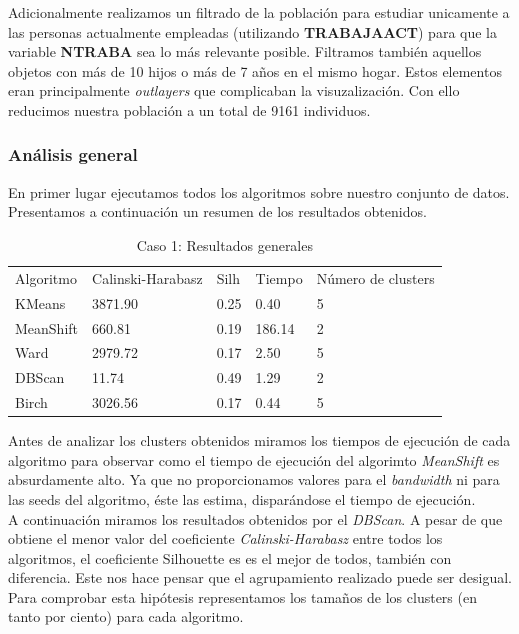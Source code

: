 \documentclass[11pt,a4paper]{article}
\begin{document}
	Adicionalmente realizamos un filtrado de la población para estudiar unicamente a las personas actualmente empleadas (utilizando \textbf{TRABAJAACT}) para que la variable \textbf{NTRABA} sea lo más relevante posible. Filtramos también aquellos objetos con más de 10 hijos o más de 7 años en el mismo hogar. Estos elementos eran principalmente \emph{outlayers} que complicaban la visuzalización. Con ello reducimos nuestra población a un total de 9161 individuos.
	
	\subsubsection{Análisis general}
	
	En primer lugar ejecutamos todos los algoritmos sobre nuestro conjunto de datos. Presentamos a continuación un resumen de los resultados obtenidos. \\
	
	\begin{table}[H]
		\centering
		\caption{Caso 1: Resultados generales}
		\label{resultados1}
		\begin{tabular}{lllll}
			Algoritmo & Calinski-Harabasz & Silh & Tiempo & Número de clusters \\
			KMeans    & 3871.90 & 0.25 & 0.40   & 5                   \\
			MeanShift & 660.81  & 0.19 & 186.14 & 2                   \\
			Ward      & 2979.72 & 0.17 & 2.50   & 5                   \\
			DBScan    & 11.74   & 0.49 & 1.29   & 2                   \\
			Birch     & 3026.56 & 0.17 & 0.44   & 5                  
		\end{tabular}
	\end{table}

	Antes de analizar los clusters obtenidos miramos los tiempos de ejecución de cada algoritmo para observar como el tiempo de ejecución del algorimto \emph{MeanShift} es absurdamente alto. Ya que no proporcionamos valores para el \emph{bandwidth} ni para las seeds del algoritmo, éste las estima, disparándose el tiempo de ejecución. \\ 
	
	A continuación miramos los resultados obtenidos por el \emph{DBScan}. A pesar de que obtiene el menor valor del coeficiente \emph{Calinski-Harabasz} entre todos los algoritmos, el coeficiente Silhouette es es el mejor de todos, también con diferencia. Este nos hace pensar que el agrupamiento realizado puede ser desigual. Para comprobar esta hipótesis representamos los tamaños de los clusters (en tanto por ciento) para cada algoritmo. \\
	
\end{document}
